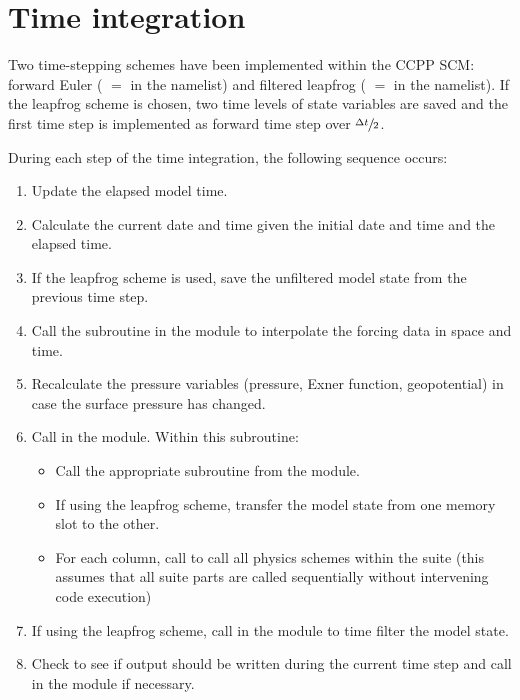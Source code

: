 \section{Time integration}
\label{section: time integration}
Two time-stepping schemes have been implemented within the CCPP SCM: forward Euler ( $=$  in the  namelist) and filtered leapfrog ( $=$  in the  namelist). If the leapfrog scheme is chosen, two time levels of state variables are saved and the first time step is implemented as forward time step over $\sfrac{\Delta t}{2}$.

During each step of the time integration, the following sequence occurs:
\begin{enumerate}
\item Update the elapsed model time.
\item Calculate the current date and time given the initial date and time and the elapsed time.
\item If the leapfrog scheme is used, save the unfiltered model state from the previous time step.
\item Call the  subroutine in the  module to interpolate the forcing data in space and time.
\item Recalculate the pressure variables (pressure, Exner function, geopotential) in case the surface pressure has changed.
\item Call  in the  module. Within this subroutine:
\begin{itemize}
\item Call the appropriate  subroutine from the  module.
\item If using the leapfrog scheme, transfer the model state from one memory slot to the other.
\item For each column, call  to call all physics schemes within the suite (this assumes that all suite parts are called sequentially without intervening code execution)
\end{itemize}
\item If using the leapfrog scheme, call  in the  module to time filter the model state.
\item Check to see if output should be written during the current time step and call  in the  module if necessary.
\end{enumerate}

